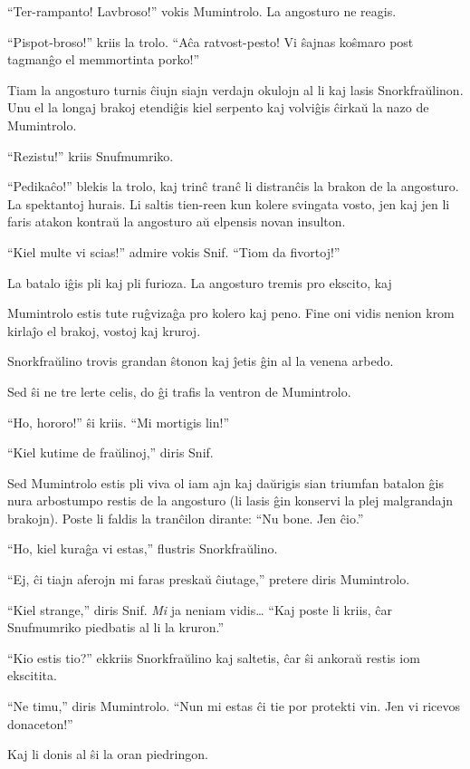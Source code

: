 ``Ter-rampanto! Lavbroso!'' vokis Mumintrolo. La angosturo ne reagis.

``Pispot-broso!'' kriis la trolo. ``Aĉa ratvost-pesto! Vi ŝajnas koŝmaro post tagmanĝo el memmortinta porko!''

Tiam la angosturo turnis ĉiujn siajn verdajn okulojn al li kaj lasis Snorkfraŭlinon. Unu el la longaj brakoj etendiĝis kiel serpento kaj volviĝis ĉirkaŭ la nazo de Mumintrolo.

``Rezistu!'' kriis Snufmumriko.

``Pedikaĉo!'' blekis la trolo, kaj trinĉ tranĉ li distranĉis la brakon de la angosturo. La spektantoj hurais. Li saltis tien-reen kun kolere svingata vosto, jen kaj jen li faris atakon kontraŭ la angosturo aŭ elpensis novan insulton.

``Kiel multe vi scias!'' admire vokis Snif. ``Tiom da fivortoj!''

La batalo iĝis pli kaj pli furioza. La angosturo tremis pro ekscito, kaj

Mumintrolo estis tute ruĝvizaĝa pro kolero kaj peno. Fine oni vidis nenion krom kirlaĵo el brakoj, vostoj kaj kruroj.

Snorkfraŭlino trovis grandan ŝtonon kaj ĵetis ĝin al la venena arbedo.

Sed ŝi ne tre lerte celis, do ĝi trafis la ventron de Mumintrolo.

``Ho, hororo!'' ŝi kriis. ``Mi mortigis lin!''

``Kiel kutime de fraŭlinoj,'' diris Snif.

Sed Mumintrolo estis pli viva ol iam ajn kaj daŭrigis sian triumfan batalon ĝis nura arbostumpo restis de la angosturo (li lasis ĝin konservi la plej malgrandajn brakojn). Poste li faldis la tranĉilon dirante: ``Nu bone. Jen ĉio.''

``Ho, kiel kuraĝa vi estas,'' flustris Snorkfraŭlino.

``Ej, ĉi tiajn aferojn mi faras preskaŭ ĉiutage,'' pretere diris Mumintrolo.

``Kiel strange,'' diris Snif. \emph{Mi} ja neniam vidis{\ldots} ``Kaj poste li kriis, ĉar Snufmumriko piedbatis al li la kruron.''

``Kio estis tio?'' ekkriis Snorkfraŭlino kaj saltetis, ĉar ŝi ankoraŭ restis iom ekscitita.

``Ne timu,'' diris Mumintrolo. ``Nun mi estas ĉi tie por protekti vin. Jen vi ricevos donaceton!''

Kaj li donis al ŝi la oran piedringon.

